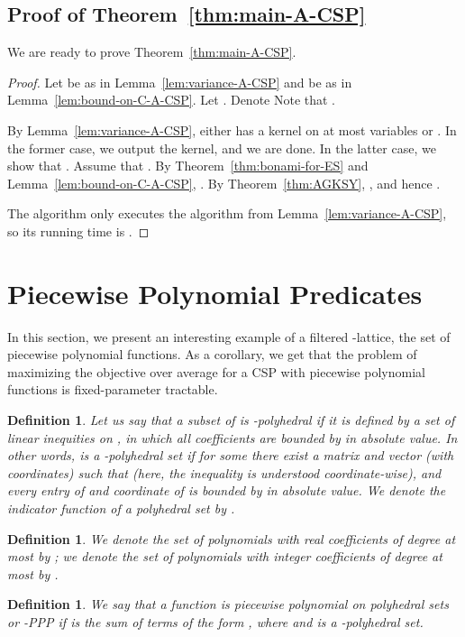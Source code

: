 \documentclass[11pt]{article}
\newtheorem{definition}[theorem]{Definition}
\begin{document}
\subsection{Proof of Theorem~\ref{thm:main-A-CSP}}
We are ready to prove Theorem~\ref{thm:main-A-CSP}.
\smallskip
\begin{proof}
Let  be as in Lemma~\ref{lem:variance-A-CSP} and  be as in Lemma~\ref{lem:bound-on-C-A-CSP}.
Let . Denote  Note that .

By Lemma~\ref{lem:variance-A-CSP}, either  has a kernel on at most  variables or
. In the former case, we output the kernel, and we are done. In the latter case, we show that . Assume that . By
Theorem~\ref{thm:bonami-for-ES} and Lemma~\ref{lem:bound-on-C-A-CSP},
.
By Theorem~\ref{thm:AGKSY}, , and hence .

The algorithm only executes the algorithm from Lemma~\ref{lem:variance-A-CSP}, so its running time is .
\end{proof}

\section{Piecewise Polynomial Predicates}\label{sec:PPP}
In this section, we present an interesting example of a filtered -lattice, the set of piecewise polynomial functions.  As a corollary,
we get that  the problem of maximizing the objective over average for a CSP with piecewise polynomial functions is fixed-parameter tractable.

\begin{definition}
Let us say that a subset  of  is -polyhedral if it is defined by a set of linear inequities on , in which all coefficients are bounded by  in absolute value.
 In other words,  is a -polyhedral set if for some  there exist a  matrix  and vector  (with  coordinates) such that
   (here, the inequality  is understood coordinate-wise), and  every entry of  and coordinate of  is bounded by  in absolute value.
 We denote the indicator function of a polyhedral set  by .
\end{definition}
\begin{definition}
We denote the set of polynomials  with real coefficients  of degree at most  by ;
we denote the set of polynomials   with integer coefficients of degree at most   by .
\end{definition}
\begin{definition}
We say that a function  is piecewise polynomial on polyhedral sets or -PPP if  is the sum of terms of the form , where  and  is a -polyhedral set.
\end{definition}
\end{document}
